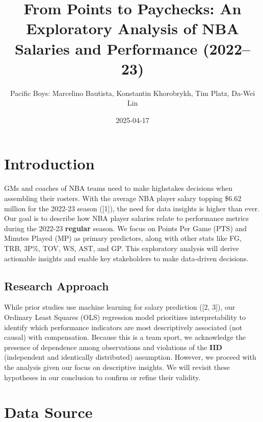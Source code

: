 \documentclass[
  11pt,
]{article}
\title{From Points to Paychecks: An Exploratory Analysis of NBA Salaries and Performance (2022--23)}
\author{Pacific Boys: Marcelino Bautista, Konstantin Khorobrykh, Tim Platz, Da-Wei Lin}
\date{2025-04-17}
\begin{document}
\maketitle

{
\setcounter{tocdepth}{2}
\tableofcontents
}
\newpage

\hypertarget{introduction}{%
\section{Introduction}\label{introduction}}

GMs and coaches of NBA teams need to make highstakes decisions when assembling their rosters. With the average NBA player salary topping \$6.62 million for the 2022-23 season ({[}1{]}), the need for data insights is higher than ever. Our goal is to describe how NBA player salaries relate to performance metrics during the 2022-23 \textbf{regular} season. We focus on Points Per Game (PTS) and Minutes Played (MP) as primary predictors, along with other stats like FG, TRB, 3P\%, TOV, WS, AST, and GP. This exploratory analysis will derive actionable insights and enable key stakeholders to make data-driven decisions.

\hypertarget{research-approach}{%
\subsection{Research Approach}\label{research-approach}}

While prior studies use machine learning for salary prediction ({[}2, 3{]}), our Ordinary Least Squares (OLS) regression model prioritizes interpretability
to identify which performance indicators are most descriptively associated (not causal) with compensation. Because this is a team sport, we acknowledge
the presence of dependence among observations and violations of the \textbf{IID} (independent and identically distributed) assumption. However, we proceed with the analysis given our focus on descriptive insights. We will revisit these hypotheses in our conclusion to confirm or refine their validity.

\hypertarget{data-source}{%
\section{Data Source}\label{data-source}}
\end{document}
